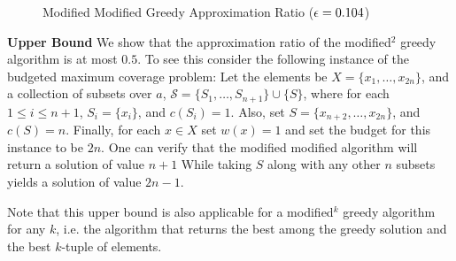 \begin{figure}
\caption{
\label{fig:mmgreedy}
Modified Modified Greedy Approximation Ratio ($\epsilon = 0.104$)
}
\end{figure}

\textbf{Upper Bound}
We show that the approximation ratio of the modified$^2$ greedy algorithm is at most $0.5$.
To see this consider the following instance of the budgeted maximum coverage problem:
Let the elements be $X = \{x_1, \dots, x_{2n}\}$, 
and a collection of subsets over $a$, $\mathcal{S} = \{S_1, \dots, S_{n + 1}\} \cup \{S\}$,
where for each $1 \leq i \leq n + 1$, $S_i = \{x_i\}$, and $c(S_i) = 1$. 
Also, set $S = \{x_{n + 2}, \dots, x_{2n}\}$, and $c(S) = n$.
Finally, for each $x \in X$ set $w(x) = 1$ and set the budget for this instance to be $2n$.
One can verify that the modified modified algorithm will return a solution of value $n + 1$
While taking $S$ along with any other $n$ subsets yields a solution of value $2n - 1$.  

Note that this upper bound is also applicable for a modified$^k$ greedy algorithm for any $k$, i.e. the algorithm that returns the best among the greedy solution and the best $k$-tuple of elements.



